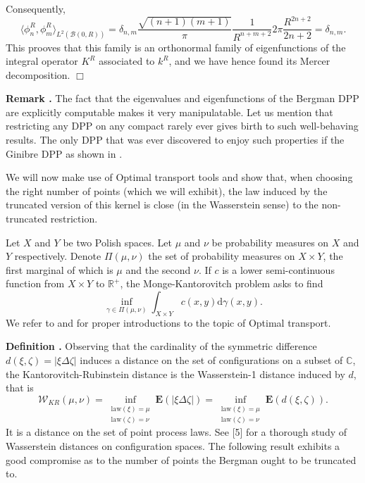 \documentclass[11pt]{article}
\newcommand{\qed}{\hfill$\Box$}
\newcounter{cnt}
\newcommand{\cnt}{\thecnt \stepcounter{cnt}}
\begin{document}
Consequently,
\[
\langle \phi_n^R, \phi_m^R \rangle_{L^2(\mathcal{B}(0,R))} = \delta_{n,m} \frac{\sqrt{(n+1)(m+1)}}{\pi} \frac{1}{R^{n+m+2}} 2\pi \frac{R^{2n+2}}{2n+2} = \delta_{n,m}.
\]
This prooves that this family is an orthonormal family of eigenfunctions of the integral operator $K^R$ associated to $k^R$, and we have hence found its Mercer decomposition. \qed

\textbf{Remark \cnt.} The fact that the eigenvalues and eigenfunctions of the Bergman DPP are explicitly computable makes it very manipulatable. Let us mention that restricting any DPP on any compact rarely ever gives birth to such well-behaving results. The only DPP that was ever discovered to enjoy such properties if the Ginibre DPP as shown in \cite{DecreusefondMoroz2021}.

We will now make use of Optimal transport tools and show that, when choosing the right number of points (which we will exhibit), the law induced by the truncated version of this kernel is close (in the Wasserstein sense) to the non-truncated restriction.

Let $X$ and $Y$ be two Polish spaces. Let $\mu$ and $\nu$ be probability measures on $X$ and $Y$ respectively. Denote $\Pi(\mu, \nu)$ the set of probability measures on $X \times Y$, the first marginal of which is $\mu$ and the second $\nu$. If $c$ is a lower semi-continuous function from $X \times Y$ to $\mathbb{R}^+$, the Monge-Kantorovitch problem asks to find
\[
\inf_{\gamma \in \Pi(\mu,\nu)} \int_{X \times Y} c(x,y) \mathrm d\gamma(x,y).
\]
We refer to \cite{Villani2021} and \cite{Villani2009} for proper introductions to the topic of Optimal transport.

\textbf{Definition \cnt.} Observing that the cardinality of the symmetric difference $d(\xi, \zeta) = |\xi \Delta \zeta|$ induces a distance on the set of configurations on a subset of $\mathbb{C}$, the Kantorovitch-Rubinstein distance is the Wasserstein-1 distance induced by $d$, that is
\[
\mathcal{W}_{KR}(\mu, \nu) = \inf_{\substack{\text{law}(\xi)=\mu \\ \text{law}(\zeta)=\nu}} \mathbf{E}(|\xi \Delta \zeta|) = \inf_{\substack{\text{law}(\xi)=\mu \\ \text{law}(\zeta)=\nu}} \mathbf{E}(d(\xi, \zeta)).
\]
It is a distance on the set of point process laws. See [5] for a thorough study of Wasserstein distances on configuration spaces. The following result exhibits a good compromise as to the number of points the Bergman ought to be truncated to.
\end{document}
